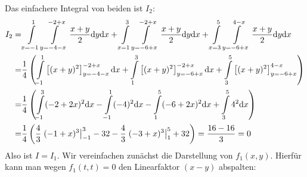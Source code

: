 {Das einfachere Integral von beiden ist $I_2$: 
\begin{align*}
I_2=& \int\limits_{x=-1}^1\int\limits_{y=-4-x}^{-2+x} \frac {x+y}2 \mathrm{d} y  \mathrm{d} x
+ \int\limits_{x=1}^3\int\limits_{y=-6+x}^{-2+x} \frac{x+y}2 \mathrm{d} y \mathrm{d} x
+ \int\limits_{x=3}^5\int\limits_{y=-6+x}^{4-x}\frac{x+y}2 \mathrm{d} y \mathrm{d} x\\
=& \frac 14\left( \int\limits_{-1}^1 \left[(x+y)^2\right]_{y=-4-x}^{-2+x}\mathrm{d} x
+ \int\limits_{1}^3\left[(x+y)^2\right]_{y=-6+x}^{-2+x} \mathrm{d} x
+ \int\limits_{3}^5\left[(x+y)^2\right]_{y=-6+x}^{4-x}\right)\\
=& \frac 14 \left( \int\limits_{-1}^3(-2+2x)^2\mathrm{d} x - \int\limits_{-1}^1(-4)^2\mathrm{d} x
- \int\limits_{1}^5(-6+2x)^2\mathrm{d} x + \int\limits_{3}^54^2\mathrm{d} x\right)\\
=& \frac 1{4}\left( \frac 43\left.(-1+x)^3\right|_{-1}^3 - 32 - \frac
43 \left.(-3+x)^3\right|_{1}^5+32\right)=\frac{16-16  }{3}=0
\end{align*}
Also ist $I=I_1$. Wir vereinfachen zun\"achst die Darstellung von $f_1(x,y)$. Hierf\"ur kann man
wegen $f_1(t,t)=0$ den Linearfaktor $(x-y)$ abspalten: 
}
